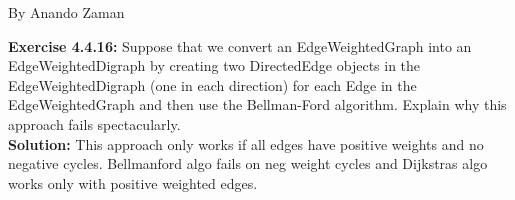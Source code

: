 \documentclass[11pt,fleqn]{article}
\begin{document}
By Anando Zaman


\textbf{Exercise 4.4.16:} Suppose that we convert an EdgeWeightedGraph into an EdgeWeightedDigraph
by creating two DirectedEdge objects in the EdgeWeightedDigraph (one in each direction)
for each Edge in the EdgeWeightedGraph and then use the Bellman-Ford algorithm. Explain why this approach
fails spectacularly.\\

\textbf{Solution:} This approach only works if all edges have positive weights and no negative cycles. Bellmanford algo fails on neg weight cycles and Dijkstras algo works only with positive weighted edges.


	
\end{document}
